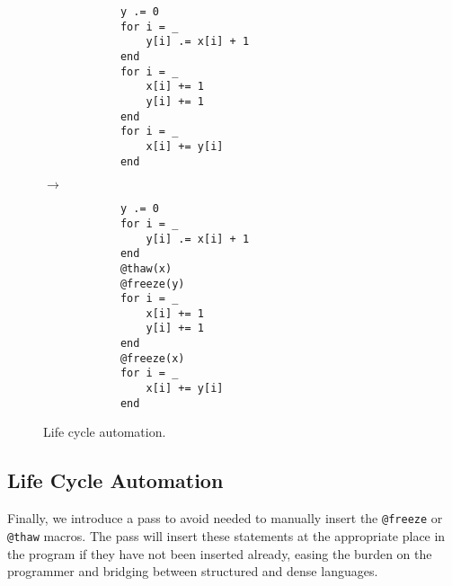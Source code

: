     \begin{wrapfigure}{R}{0.34\linewidth}
        \vspace{-28pt}
        \begin{minipage}{0.15\textwidth}
        \begin{verbatim}
            y .= 0
            for i = _
                y[i] .= x[i] + 1
            end
            for i = _
                x[i] += 1
                y[i] += 1
            end 
            for i = _
                x[i] += y[i]
            end
        \end{verbatim}
        \end{minipage}
        $\rightarrow$
        \begin{minipage}{0.15\textwidth}
        \begin{verbatim}
            y .= 0
            for i = _
                y[i] .= x[i] + 1
            end
            @thaw(x)
            @freeze(y)
            for i = _
                x[i] += 1
                y[i] += 1
            end
            @freeze(x)
            for i = _
                x[i] += y[i]
            end
        \end{verbatim}
        \end{minipage}
        \vspace{-8pt}
        \caption{Life cycle automation.} \label{fig:lifecycles}
        \vspace{-12pt}
    \end{wrapfigure}
\subsection{Life Cycle Automation}
Finally, we introduce a pass to avoid needed to manually insert the \texttt{@freeze} or \texttt{@thaw} macros.
%
The pass will insert these statements at the appropriate place in the program if they have not been inserted already, easing the burden on the programmer and bridging between structured and dense languages.

